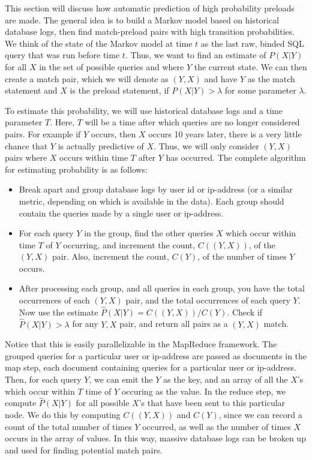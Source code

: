 \documentclass[12pt]{article}
\begin{document}
This section will discuss how automatic prediction of high probability preloads are made. The general idea is to build a Markov model based on historical database logs, then find match-preload pairs with high transition probabilities. We think of the state of the Markov model at time $t$ as the last raw, binded SQL query that was run before time $t$. Thus, we want to find an estimate of $P(X | Y)$ for all $X$ in the set of possible queries and where $Y$ the current state. We can then create a match pair, which we will denote as $(Y, X)$ and have $Y$ as the match statement and $X$ is the preload statement, if $P(X | Y) > \lambda$ for some parameter $\lambda$.

To estimate this probability, we will use historical database logs and a time parameter $T$. Here, $T$ will be a time after which queries are no longer considered pairs. For example if $Y$ occurs, then $X$ occurs 10 years later, there is a very little chance that $Y$ is actually predictive of $X$. Thus, we will only consider $(Y, X)$ pairs where $X$ occurs within time $T$ after $Y$ has occurred. The complete algorithm for estimating probability is as follows:

\begin{itemize}
  \item Break apart and group database logs by user id or ip-address (or a similar metric, depending on which is available in the data). Each group should contain the queries made by a single user or ip-address.
  \item For each query $Y$ in the group, find the other queries $X$ which occur within time $T$ of $Y$ occurring, and increment the count, $C((Y,X))$, of the $(Y,X)$ pair. Also, increment the count, $C(Y)$, of the number of times $Y$ occurs.
  \item After processing each group, and all queries in each group, you have the total occurrences of each $(Y,X)$ pair, and the total occurrences of each query $Y$. Now use the estimate $\hat{P}(X | Y) = C((Y,X))/C(Y)$. Check if $\hat{P}(X | Y) > \lambda$ for any $Y, X$ pair, and return all pairs as a $(Y, X)$ match.
\end{itemize}

Notice that this is easily parallelizable in the MapReduce framework. The grouped queries for a particular user or ip-address are passed as documents in the map step, each document containing queries for a particular user or ip-address. Then, for each query $Y$, we can emit the $Y$ as the key, and an array of all the $X$'s which occur within $T$ time of $Y$ occuring as the value. In the reduce step, we compute $\hat{P}(X | Y)$ for all possible $X$'s that have been sent to this particular node. We do this by computing $C((Y,X))$ and $C(Y)$, since we can record a count of the total number of times $Y$ occurred, as well as the number of times $X$ occurs in the array of values. In this way, massive database logs can be broken up and used for finding potential match pairs.
\end{document}
